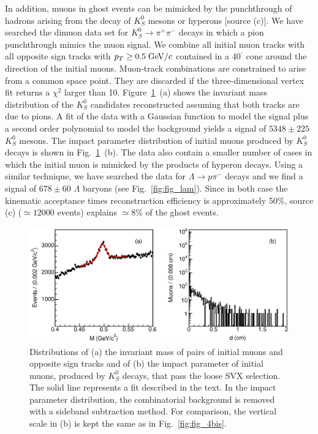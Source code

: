 \documentclass[aps,prd,preprint,floatfix,nofootinbib,superscriptaddress,showpacs,amssymb]{revtex4}
\def\deg{^\circ}
\begin{document}
 In addition, muons in ghost events can be mimicked by the punchthrough
 of hadrons arising from the decay of $K^0_S$ mesons or hyperons [source (c)]. We have
 searched the dimuon data set for $K^0_S \rightarrow \pi^+\pi^-$ decays in
 which a pion punchthrough mimics the muon signal. We combine all initial
 muon tracks with all opposite sign tracks with $p_T \geq 0.5 \; {\rm GeV/}c$ 
 contained in a 40$^{\deg}$ cone around the direction of the initial muons. 
 Muon-track combinations are constrained to arise from a common space point.
 They are discarded if the three-dimensional vertex fit returns a $\chi^2$
 larger than 10. Figure~\ref{fig:fake_3}~(a) shows the invariant mass
 distribution of the $K^0_S$ candidates reconstructed assuming that both
 tracks are due to pions. A fit of the data with a Gaussian function to model
 the signal plus a second order polynomial to model the background yields
 a signal of $5348 \pm 225$ $K^0_S$ mesons. The impact parameter
 distribution of initial muons produced by $K^0_S$ decays is shown in
 Fig.~\ref{fig:fake_3}~(b). The data also contain a smaller number of cases
 in which the initial muon is mimicked by the products of hyperon decays.
 Using a similar technique, we have searched the data for
 $\Lambda \rightarrow p \pi^-$ decays and we find a signal of 
 $678 \pm 60$ $\Lambda$ baryons (see Fig.~\ref{fig:fig_lam}).
 Since in both case the kinematic acceptance times reconstruction efficiency
 is approximately 50\%,  source (c)
 ($\simeq 12000$ events)  explains $\simeq 8$\% of the ghost events.
 \begin{figure}[]
 \begin{center}
 \vspace{-0.2in}
 \leavevmode
 \includegraphics*[width=\textwidth]{K0_mass_ip.eps}
 \caption[] {Distributions of (a) the invariant mass of pairs of initial
             muons and opposite sign tracks and of (b) the impact parameter
             of initial muons, produced by $K^0_S$ decays, that pass the
             loose SVX selection. The solid line represents a fit described
             in the text. In the impact parameter distribution, the
             combinatorial background is removed with a sideband subtraction
             method. For comparison, the vertical scale in (b) is kept the
             same as in Fig.~\ref{fig:fig_4bis}.}
 \label{fig:fake_3}
 \end{center}
 \end{figure}
\end{document}
